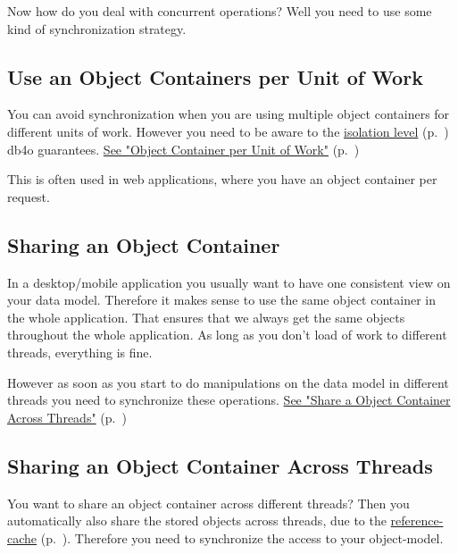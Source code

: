 Now how do you deal with concurrent operations? Well you need to use some kind of synchronization strategy.

\subsection*{Use an Object Containers per Unit of Work}

You can avoid synchronization when you are using multiple object containers for different units of work. However you need to be aware to the \hyperref[ref:basics-acid-and-transactions-isolation]{isolation level} (p.~\pageref{ref:basics-acid-and-transactions-isolation}) db4o guarantees. \hyperref[ref:advanced-topics-concurrency-object-container-per-unit-of-work]{See "Object Container per Unit of Work"} (p.~\pageref{ref:advanced-topics-concurrency-object-container-per-unit-of-work})

This is often used in web applications, where you have an object container per request.

\subsection*{Sharing an Object Container}

In a desktop/mobile application you usually want to have one consistent view on your data model. Therefore it makes sense to use the same object container in the whole application. That ensures that we always get the same objects throughout the whole application. As long as you don't load of work to different threads, everything is fine.

However as soon as you start to do manipulations on the data model in different threads you need to synchronize these operations. \hyperref[ref:advanced-topics-concurrency-share-object-container-threads]{See "Share a Object Container Across Threads"} (p.~\pageref{ref:advanced-topics-concurrency-share-object-container-threads})

\subsection{Sharing an Object Container Across Threads}
\label{ref:advanced-topics-concurrency-share-object-container-threads}

You want to share an object container across different threads? Then you automatically also share the stored objects across threads, due to the \hyperref[ref:basics-indentity-concept-reference-cache]{reference-cache} (p.~\pageref{ref:basics-indentity-concept-reference-cache}). Therefore you need to synchronize the access to your object-model.

